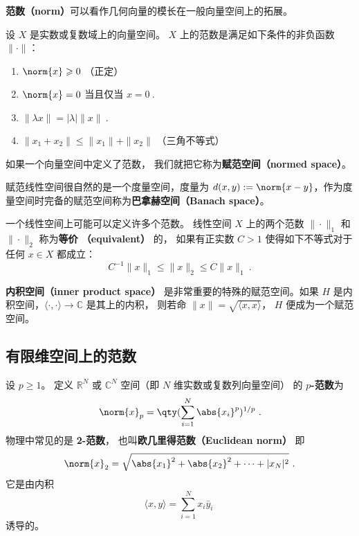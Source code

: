 
\begin{issues}
\issueDraft
\end{issues}



\textbf{范数（norm）}可以看作几何向量的模长在一般向量空间上的拓展。
\begin{definition}{}\label{def_NormV_1}
设 $X$ 是实数或复数域上的向量空间。 $X$ 上的范数是满足如下条件的非负函数 $\|\cdot\|$：
\begin{enumerate}
\item $\norm{x} \geqslant 0$ （正定）
\item $\norm{x} = 0$ 当且仅当 $x = 0~.$
\item $\|\lambda x\| = |\lambda|\|x\|~.$
\item $\|x_1+x_2\| \leqslant \|x_1\|+ \|x_2\|$ （三角不等式）
\end{enumerate}
如果一个向量空间中定义了范数， 我们就把它称为\textbf{赋范空间（normed space）}。
\end{definition}

赋范线性空间很自然的是一个度量空间，度量为 $d(x,y) := \norm{x-y}$，作为度量空间时完备的赋范空间称为\textbf{巴拿赫空间（Banach space）}。

一个线性空间上可能可以定义许多个范数。 线性空间 $X$ 上的两个范数 $\|\cdot\|_1$ 和 $\|\cdot\|_2$ 称为\textbf{等价 （equivalent）} 的， 如果有正实数 $C>1$ 使得如下不等式对于任何 $x\in X$ 都成立：
$$
C^{-1}\|x\|_{1}\leq\|x\|_2\leq C\|x\|_1~.
$$

\textbf{内积空间（inner product space）} 是非常重要的特殊的赋范空间。如果 $H$ 是内积空间，$\langle\cdot,\cdot\rangle\to\mathbb C$ 是其上的内积， 则若命 $\|x\|=\sqrt{\langle x,x\rangle }$， $H$ 便成为一个赋范空间。

\subsection{有限维空间上的范数}
设 $p\geq1$。 定义 $\mathbb R^N$ 或 $\mathbb C^N$ 空间（即 $N$ 维实数或复数列向量空间） 的 \textbf{$p$-范数}为
\begin{equation}
\norm{ x}_p = \qty(\sum_{i=1}^N \abs{x_i}^p)^{1/p}~.
\end{equation}
物理中常见的是 \textbf{2-范数}， 也叫\textbf{欧几里得范数（Euclidean norm）} 即
\begin{equation}
\norm{ x}_2 = \sqrt{\abs{x_1}^2 + \abs{x_2}^2 + \dots+|x_N|^2}~.
\end{equation}
它是由内积
$$
\langle x,y\rangle=\sum_{i=1}^Nx_i\bar y_i~
$$
诱导的。

